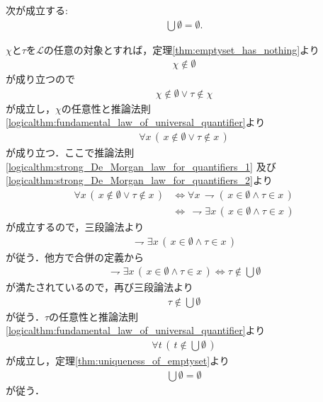 	\begin{screen}
		\begin{thm}[空集合の合併は空]\label{thm:the_union_of_the_emptyset_is_empty}
			次が成立する:
			\begin{align}
				\bigcup \emptyset = \emptyset.
			\end{align}
		\end{thm}
	\end{screen}
	
	\begin{prf}
		$\chi$と$\tau$を$\mathcal{L}$の任意の対象とすれば，定理\ref{thm:emptyset_has_nothing}より
		\begin{align}
			\chi \notin \emptyset
		\end{align}
		が成り立つので
		\begin{align}
			\chi \notin \emptyset \vee \tau \notin \chi
		\end{align}
		が成立し，$\chi$の任意性と推論法則\ref{logicalthm:fundamental_law_of_universal_quantifier}より
		\begin{align}
			\forall x\, (\, x \notin \emptyset \vee \tau \notin x\, )
		\end{align}
		が成り立つ．ここで推論法則\ref{logicalthm:strong_De_Morgan_law_for_quantifiers_1}
		及び\ref{logicalthm:strong_De_Morgan_law_for_quantifiers_2}より
		\begin{align}
			\forall x\, (\, x \notin \emptyset \vee \tau \notin x\, )
			&\Longleftrightarrow \forall x\, \rightharpoondown (\, x \in \emptyset \wedge \tau \in x\, ) \\
			&\Longleftrightarrow\, \rightharpoondown \exists x\, (\, x \in \emptyset \wedge \tau \in x\, )
		\end{align}
		が成立するので，三段論法より
		\begin{align}
			\rightharpoondown \exists x\, (\, x \in \emptyset \wedge \tau \in x\, )
		\end{align}
		が従う．他方で合併の定義から
		\begin{align}
			\rightharpoondown \exists x\, (\, x \in \emptyset \wedge \tau \in x\, )
			\Longleftrightarrow \tau \notin \bigcup \emptyset
		\end{align}
		が満たされているので，再び三段論法より
		\begin{align}
			\tau \notin \bigcup \emptyset
		\end{align}
		が従う．$\tau$の任意性と推論法則\ref{logicalthm:fundamental_law_of_universal_quantifier}より
		\begin{align}
			\forall t\, (\, t \notin \bigcup \emptyset\, )
		\end{align}
		が成立し，定理\ref{thm:uniqueness_of_emptyset}より
		\begin{align}
			\bigcup \emptyset = \emptyset
		\end{align}
		が従う．
		\QED
	\end{prf}
	
